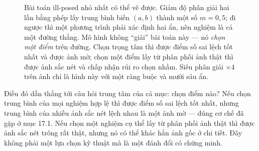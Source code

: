 \documentclass[../../../deep_learning.tex]{subfiles}
\begin{document}
\begin{figure}[H]\centering
{}
\caption{Bài toán ill-posed nhỏ nhất có thể vẽ được. Giảm độ phân giải hai lần bằng phép lấy trung bình biến \((a,b)\) thành một số \(m=0{,}5\); đi ngược thì một phương trình phải xác định hai ẩn, nên nghiệm là cả một đường thẳng. Mô hình không ``giải'' bài toán này --- nó \emph{chọn một điểm} trên đường. Chọn trọng tâm thì được điểm số sai lệch tốt nhất và được ảnh mờ; chọn một điểm lấy từ phân phối ảnh thật thì được ảnh sắc nét và chấp nhận rủi ro chọn nhầm. Siêu phân giải \(\times 4\) trên ảnh chỉ là hình này với một ràng buộc và mười sáu ẩn.}
\label{fig:ill-posed-1d}
\end{figure}

Điều đó dẫn thẳng tới câu hỏi trung tâm của cả mục: chọn điểm nào? Nếu chọn trung bình của mọi nghiệm hợp lệ thì được điểm số sai lệch tốt nhất, nhưng trung bình của nhiều ảnh sắc nét lệch nhau là một ảnh mờ --- đúng cơ chế đã gặp ở mục 17.1.
 Nếu chọn một nghiệm cụ thể lấy từ phân phối ảnh thật thì được ảnh sắc nét trông rất thật, nhưng nó có thể khác hẳn ảnh gốc ở chi tiết. Đây không phải một lựa chọn kỹ thuật mà là một đánh đổi có chứng minh.
\end{document}
